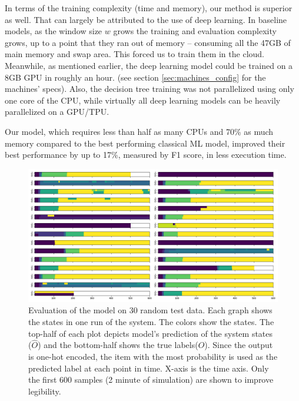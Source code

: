 In terms of the training complexity (time and memory), our method is superior as well. That can largely be attributed to the use of deep learning. In baseline models, as the window size $w$ grows the training and evaluation complexity grows, up to a point that they ran out of memory -- consuming all the 47GB of main memory and swap area. This forced us to train them in the cloud. Meanwhile, as mentioned earlier, the deep learning model could be trained on a 8GB GPU in roughly an hour. (see section \ref{sec:machines_config} for the machines' specs). Also, the decision tree training was not parallelized using only one core of the CPU, while virtually all deep learning models can be heavily parallelized on a GPU/TPU. %

\begin{rqanswer}
Our model, which requires less than half as many CPUs and 70\% as much memory compared to the best performing classical ML model, improved their best performance by up to 17\%, measured by F1 score, in less execution time.
\end{rqanswer}


\begin{figure}
    \centering
    \includegraphics[width=\linewidth]{ASE_files/test_0.png}
    \caption{Evaluation of the model on 30 random test data. Each graph shows the states in one run of the system. The colors show the states. The top-half of each plot depicts model's prediction of the system states ($\hat{O}$) and the bottom-half shows the true labels($O$). Since the output is one-hot encoded, the item with the most probability is used as the predicted label at each point in time. X-axis is the time axis. Only the first 600 samples (2 minute of simulation) are shown to improve legibility.}
    \label{fig:test_0}
\end{figure}





